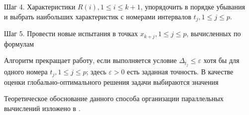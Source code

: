 \begin{equation}
\label{step3_1}
\end{equation}
\begin{equation}
\label{step3_2}
\end{equation}
\par
Шаг 4. Характеристики \(R(i),1\leqslant i\leqslant k+1\), упорядочить в порядке убывания 
\begin{equation}
\label{step4}
\end{equation}
и выбрать   наибольших характеристик с номерами интервалов \(t_j,1\leqslant j\leqslant p\).
\par
Шаг 5. Провести новые испытания в точках \(x_{k+j},1\leqslant j\leqslant p\), вычисленных по формулам
\begin{equation}
\label{step5}
\end{equation}
\par
Алгоритм прекращает работу, если выполняется условие \(\Delta_{t_j}\leqslant \varepsilon\) хотя бы для одного номера \(t_j,1\leqslant j\leqslant p\); здесь \(\varepsilon>0\) есть заданная точность. В качестве оценки глобально-оптимального решения задачи  выбираются значения
\begin{equation}

\end{equation}
\par
Теоретическое обоснование данного способа организации параллельных вычислений изложено в \cite{strGergrParOptBook}.
